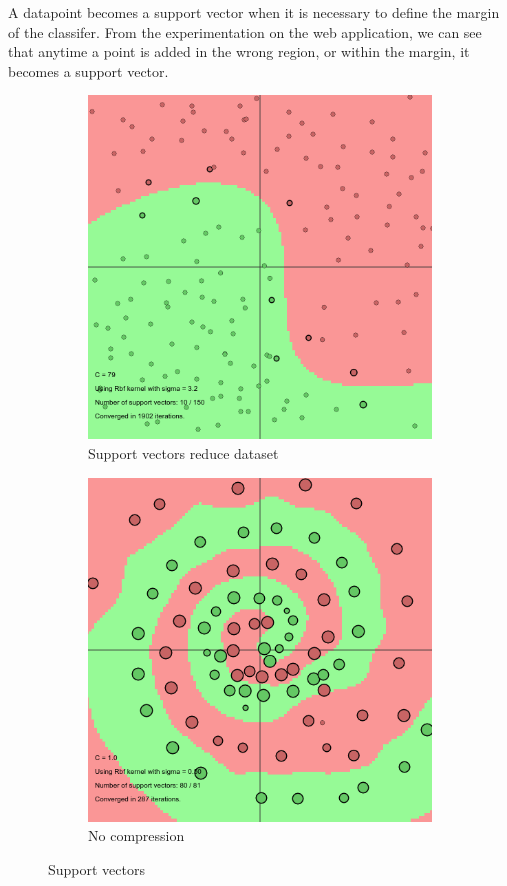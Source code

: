 \documentclass[11pt, a4paper]{article}
\begin{document}
A datapoint becomes a support vector when it is necessary to define
the margin of the classifer. From the experimentation on the web
application, we can see that anytime a point is added in the wrong
region, or within the margin, it becomes a support vector.

\begin{figure}[H]
    \centering
    \begin{subfigure}{.5\textwidth}
      \centering
      \includegraphics[width=0.9\linewidth]{1-2-1-kernel7.png}
      \caption{Support vectors reduce dataset}
      \label{fig:ker7reduced}
    \end{subfigure}%
    \begin{subfigure}{.5\textwidth}
      \centering
      \includegraphics[width=0.9\linewidth]{1-2-1-kernel7spiral.png}
      \caption{No compression}
      \label{fig:ker7spiral}
    \end{subfigure}
    \caption{Support vectors}
    \label{fig:ker7}
\end{figure}
\end{document}
